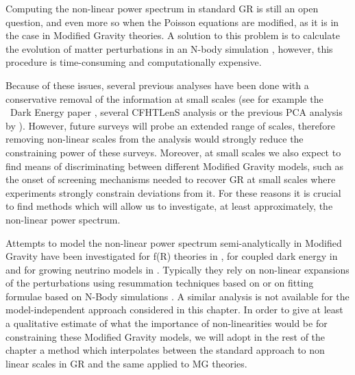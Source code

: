 Computing the non-linear power spectrum in standard GR is still an
open question, and even more so when the Poisson equations are modified,
as it is in the case in Modified Gravity theories. A solution to this problem
is to calculate the evolution of matter perturbations in an N-body
simulation
\cite{springel_cosmological_2005,fosalba_mice_2013,takahashi_revising_2012,lawrence_coyote_2010,heitmann_coyote_2014},
however, this procedure is time-consuming and computationally expensive.

Because of these issues, several previous analyses
have been done with a conservative removal of the information at small
scales (see for example the \planck\ Dark Energy paper
\cite{planck_collaboration_planck_2016},
several CFHTLenS analysis \cite{heymans_cfhtlens_2013,kitching_3d_2014}
or the previous PCA analysis by \cite{hojjati_cosmological_2012}).
However, future surveys will probe an extended range of scales, therefore
removing non-linear scales from the analysis would strongly reduce
the constraining power of these surveys. Moreover, at small scales
we also expect to find means of discriminating between different Modified
Gravity models, such as the onset of screening mechanisms needed to
recover GR at small scales where experiments strongly constrain
deviations from it. For these reasons it is crucial to find methods
which will allow us to investigate, at least approximately, the non-linear
power spectrum.

Attempts to model the non-linear power spectrum semi-analytically in Modified
Gravity have been investigated for f(R) theories in
\cite{zhao_modeling_2014,taruya_regularized_2014},
for coupled dark energy in
\cite{casas_fitting_2015,saracco_non-linear_2010,vollmer_efficient_2014}
and for growing neutrino models in \cite{brouzakis_nonlinear_2011}.
Typically they rely on non-linear expansions of the perturbations
using resummation techniques based on
\cite{pietroni_flowing_2008,taruya_closure_2008}
or on fitting formulae based on N-Body simulations
\cite{casas_fitting_2015,takahashi_revising_2012,bird_massive_2011}.
A similar analysis is not available for the model-independent approach considered
in this chapter. 
In order to give at least a qualitative estimate
of what the importance of non-linearities would be for constraining these
Modified Gravity models, we will adopt in the rest of the chapter a method 
which interpolates between the standard approach to non linear scales in GR
and the same applied to MG theories.

